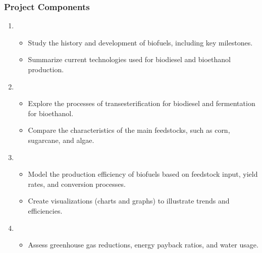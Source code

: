 \documentclass[letterpaper,10pt,english]{jupyterBook}
\begin{document}
\subsubsection{Project Components}
\label{\detokenize{ProjectSyllabus:id24}}\begin{enumerate}
%
\item {} 
\sphinxAtStartPar
{}
\begin{itemize}
\item {} 
\sphinxAtStartPar
Study the history and development of biofuels, including key milestones.

\item {} 
\sphinxAtStartPar
Summarize current technologies used for biodiesel and bioethanol production.

\end{itemize}

\item {} 
\sphinxAtStartPar
{}
\begin{itemize}
\item {} 
\sphinxAtStartPar
Explore the processes of transesterification for biodiesel and fermentation for bioethanol.

\item {} 
\sphinxAtStartPar
Compare the characteristics of the main feedstocks, such as corn, sugarcane, and algae.

\end{itemize}

\item {} 
\sphinxAtStartPar
{}
\begin{itemize}
\item {} 
\sphinxAtStartPar
Model the production efficiency of biofuels based on feedstock input, yield rates, and conversion processes.

\item {} 
\sphinxAtStartPar
Create visualizations (charts and graphs) to illustrate trends and efficiencies.

\end{itemize}

\item {} 
\sphinxAtStartPar
{}
\begin{itemize}
\item {} 
\sphinxAtStartPar
Assess greenhouse gas reductions, energy payback ratios, and water usage.


\end{itemize}
\end{enumerate}
\end{document}
